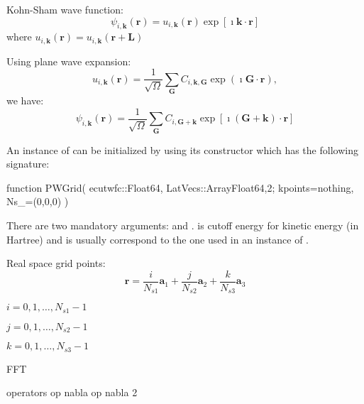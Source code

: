 Kohn-Sham wave function:
\begin{equation}
\psi_{i,\mathbf{k}}(\mathbf{r}) = u_{i,\mathbf{k}}(\mathbf{r}) \exp\left[ \imath \mathbf{k} \cdot \mathbf{r} \right]
\end{equation}
where $u_{i,\mathbf{k}}(\mathbf{r}) = u_{i,\mathbf{k}}(\mathbf{r}+\mathbf{L})$

Using plane wave expansion:
\begin{equation}
u_{i,\mathbf{k}}(\mathbf{r}) =
\frac{1}{\sqrt{\Omega}}\sum_{\mathbf{G}} C_{i,\mathbf{k},\mathbf{G}} \exp(\imath \mathbf{G} \cdot \mathbf{r}),
\end{equation}
%
we have:
\begin{equation}
\psi_{i,\mathbf{k}}(\mathbf{r}) =
\frac{1}{\sqrt{\Omega}}\sum_{\mathbf{G}} C_{i,\mathbf{G+\mathbf{k}}}
\exp\left[ \imath (\mathbf{G}+\mathbf{k}) \cdot \mathbf{r} \right]
\end{equation}



An instance of  can be initialized by using its constructor
which has the following signature:
\begin{juliacode}
function PWGrid( ecutwfc::Float64, LatVecs::Array{Float64,2};
    kpoints=nothing, Ns_=(0,0,0) )
\end{juliacode}
There are two mandatory arguments:  and .
 is cutoff energy for kinetic energy (in Hartree) and
 is usually correspond to the one used in an
instance of .

Real space grid points:
$$
\mathbf{r} = \frac{i}{N_{s1}}\mathbf{a}_{1} + \frac{j}{N_{s2}}\mathbf{a}_{2} +
\frac{k}{N_{s3}}\mathbf{a}_{3}
$$

$i = 0,1,\ldots,N_{s1}-1$

$j = 0,1,\ldots,N_{s2}-1$

$k = 0,1,\ldots,N_{s3}-1$

FFT


operators op nabla op nabla 2
